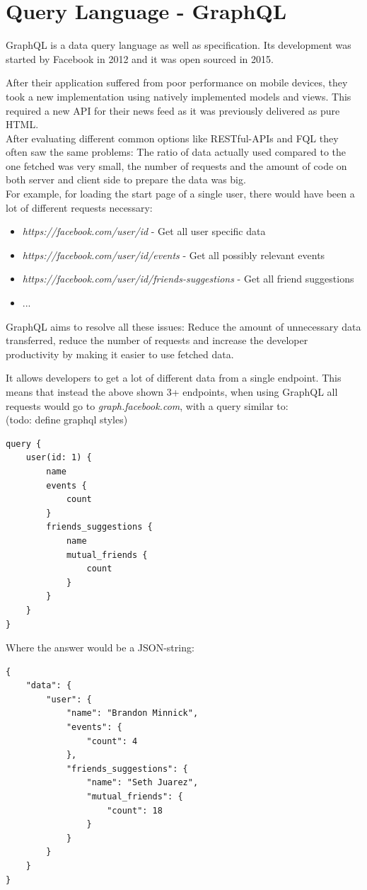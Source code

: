 \section{Query Language - GraphQL}
GraphQL is a data query language as well as specification. Its development was started by Facebook in 2012 and it was open sourced in 2015. \cite{GraphQLFoundation}

After their application suffered from poor performance on mobile devices, they took a new implementation using natively implemented models and views. This required a new API for their news feed as it was previously delivered as pure HTML.\\
After evaluating different common options like RESTful-APIs and FQL they often saw the same problems:  The ratio of data actually used compared to the one fetched was very small, the number of requests \cite{GraphQLIntro} and the amount of code on both server and client side to prepare the data was big. \cite{EngineeringFB}\\
For example, for loading the start page of a single user, there would have been a lot of different requests necessary:
\begin{itemize}
\item \emph{https://facebook.com/user/id} - Get all user specific data
\item \emph{https://facebook.com/user/id/events} - Get all possibly relevant events
\item \emph{https://facebook.com/user/id/friends-suggestions} - Get all friend suggestions
\item ...
\end{itemize} \cite{GraphQLIntro}

GraphQL aims to resolve all these issues: Reduce the amount of unnecessary data transferred, reduce the number of requests and increase the developer productivity by making it easier to use fetched data. \cite{EngineeringFB}

It allows developers to get a lot of different data from a single endpoint. This means that instead the above shown 3+ endpoints, when using GraphQL all requests would go to \emph{graph.facebook.com}, with a query similar to:\\ (todo: define graphql styles)
\newpage
\lstset{language=GraphQL}
\begin{lstlisting}[caption={A GraphQL Query},label={ex211}]
query {
	user(id: 1) {
		name
		events {
			count
		}
		friends_suggestions {
			name
			mutual_friends {
				count
			}
		}
	}
}
\end{lstlisting}
\citep[with adaptions]{GraphQLIntro}	
Where the answer would be a JSON-string:
\begin{lstlisting}[caption={Example Response Data},label={ex212}]
{ 
	"data": {
		"user": {
			"name": "Brandon Minnick",
			"events": {
				"count": 4
			},
			"friends_suggestions": {
				"name": "Seth Juarez",
				"mutual_friends": {
					"count": 18 
				}
			}
		}
	}
}
\end{lstlisting}
\citep[with adaptions]{GraphQLIntro}	

